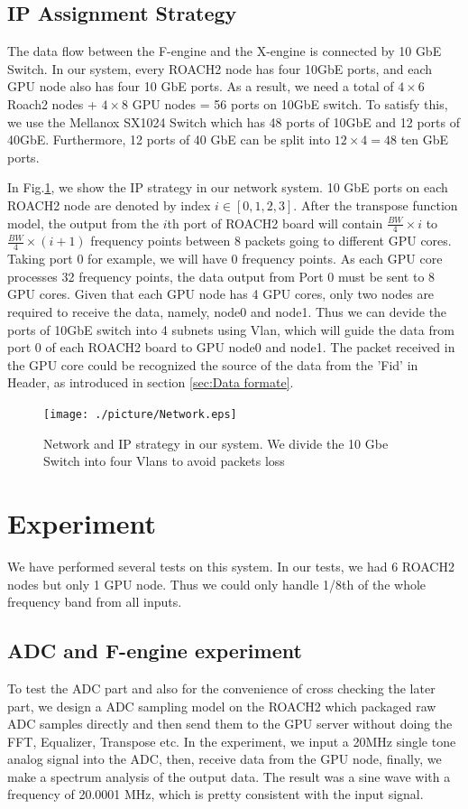 \documentclass{ws-jai}
\begin{document}
\subsection{IP Assignment Strategy\label{sec:IP assignment}}
The data flow  between the F-engine and the X-engine is connected by 10 GbE Switch. In our system, every ROACH2 node has four 10GbE ports, and each GPU node also has four 10 GbE ports. As a result, we need a total of $4\times 6 $ Roach2 nodes + $4 \times 8 $ GPU nodes = 56 ports on 10GbE switch. To satisfy this, we use the Mellanox SX1024 Switch which has 48 ports of 10GbE and 12 ports of 40GbE. Furthermore, 12 ports of 40 GbE can be split into $12\times4=48$ ten GbE ports.

In Fig.\ref{fig:network}, we show the IP strategy in our network system. 
10 GbE ports on each ROACH2 node are denoted by index $i \in[0,1,2,3]$.  After the transpose function model, the output from the $i$th port of ROACH2 board will contain $\frac{BW}{4} \times i $ to $\frac{BW}{4} \times (i+1)$ frequency points between 8 packets going to different GPU cores. Taking port 0 for example, we will have 0 frequency points. As each GPU core processes 32 frequency points, the data output from Port 0 must be sent to 8 GPU cores. Given that each GPU node has 4 GPU cores, only two nodes are required to receive the data, namely, node0 and node1.  Thus we can devide the ports of 10GbE switch into 4 subnets using Vlan, which will guide the data from port 0 of each ROACH2 board to GPU node0 and node1. The packet received in the GPU core could be recognized the source of the data  from the 'Fid' in Header, as introduced in section \ref{sec:Data formate}.
\begin{figure}[t]
 \centering
 \texttt{[image: ./picture/Network.eps]}
 \caption{Network and IP strategy in our system. We divide the 10 Gbe Switch into four Vlans to avoid packets loss \label{fig:network} }
\end{figure}

\section{Experiment}\label{sec:experiment}
We have performed several tests on this system. In our tests, we had 6 ROACH2 nodes but only 1 GPU node. Thus we could only handle 1/8th of the whole frequency band from all inputs. 

\subsection{ADC and F-engine experiment}
To test the ADC part  and also for the convenience of cross checking the later part, we design a ADC sampling model on the ROACH2 which packaged raw ADC samples directly and then send them to the GPU server without doing the FFT, Equalizer, Transpose etc. In the experiment, we input a 20MHz single tone analog signal into the ADC, then, receive data from the GPU node, finally, we make a spectrum analysis of the output data. The result was a sine wave with a frequency of 20.0001 MHz, which is pretty consistent with the input signal. 
\end{document}
